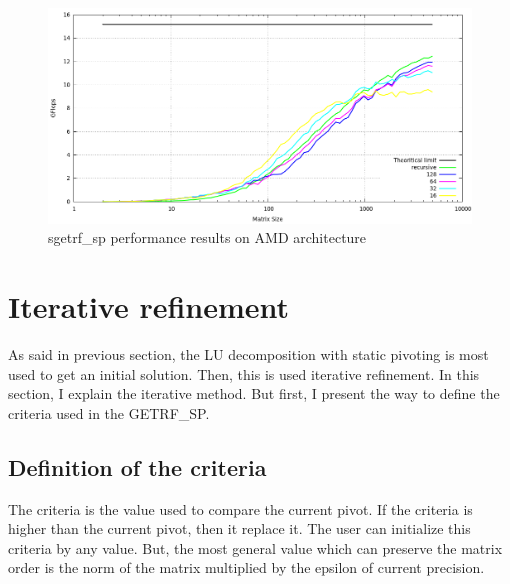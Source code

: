 \documentclass{report}
\begin{document}
\begin{figure}[!ht]
\begin{center}
\includegraphics[width=\textwidth]{exp_sgetrf_sp_amd.png} 
\end{center}
\caption{sgetrf\_sp performance results on AMD architecture}
\end{figure}

\section{Iterative refinement}
As said in previous section, the LU decomposition with static pivoting is most used to get an initial solution. Then, this is used iterative refinement. In this section, I explain the iterative method. But first, I present the way to define the criteria used in the GETRF\_SP.

\subsection{Definition of the criteria}
The criteria is the value used to compare the current pivot. If the criteria is higher than the current pivot, then it replace it. The user can initialize this criteria by any value. But, the most general value which can preserve the matrix order is the norm of the matrix multiplied by the epsilon of current precision.
\end{document}
